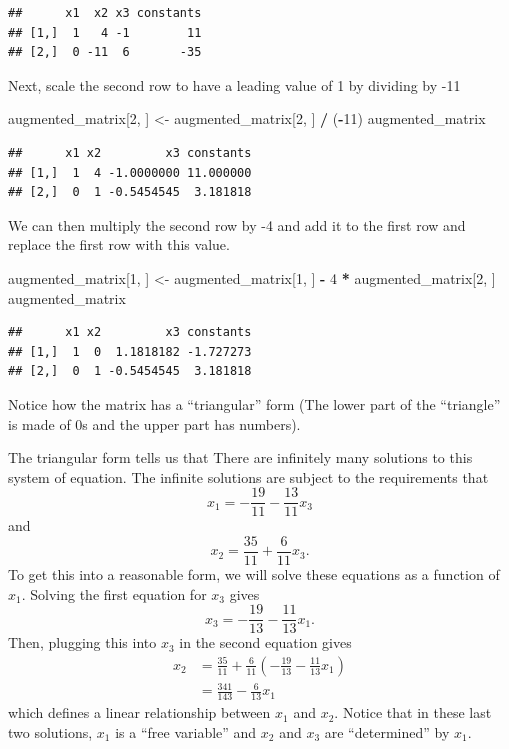 \documentclass[
]{book}
\newenvironment{Shaded}{\begin{snugshade}}{\end{snugshade}}
\newcommand{\DecValTok}[1]{\textcolor[rgb]{0.00,0.00,0.81}{#1}}
\newcommand{\NormalTok}[1]{#1}
\newcommand{\OperatorTok}[1]{\textcolor[rgb]{0.81,0.36,0.00}{\textbf{#1}}}
\newcommand{\StringTok}[1]{\textcolor[rgb]{0.31,0.60,0.02}{#1}}
\theoremstyle{definition}
\theoremstyle{definition}
\theoremstyle{definition}
\theoremstyle{definition}
\theoremstyle{remark}
\begin{document}
\begin{verbatim}
##      x1  x2 x3 constants
## [1,]  1   4 -1        11
## [2,]  0 -11  6       -35
\end{verbatim}

Next, scale the second row to have a leading value of 1 by dividing by -11

\begin{Shaded}
\begin{Highlighting}[]
\NormalTok{augmented_matrix[}\DecValTok{2}\NormalTok{, ] <-}\StringTok{ }\NormalTok{augmented_matrix[}\DecValTok{2}\NormalTok{, ] }\OperatorTok{/}\StringTok{ }\NormalTok{(}\OperatorTok{-}\DecValTok{11}\NormalTok{)}
\NormalTok{augmented_matrix}
\end{Highlighting}
\end{Shaded}

\begin{verbatim}
##      x1 x2         x3 constants
## [1,]  1  4 -1.0000000 11.000000
## [2,]  0  1 -0.5454545  3.181818
\end{verbatim}

We can then multiply the second row by -4 and add it to the first row and replace the first row with this value.

\begin{Shaded}
\begin{Highlighting}[]
\NormalTok{augmented_matrix[}\DecValTok{1}\NormalTok{, ] <-}\StringTok{ }\NormalTok{augmented_matrix[}\DecValTok{1}\NormalTok{, ] }\OperatorTok{-}\StringTok{ }\DecValTok{4} \OperatorTok{*}\StringTok{ }\NormalTok{augmented_matrix[}\DecValTok{2}\NormalTok{, ]}
\NormalTok{augmented_matrix}
\end{Highlighting}
\end{Shaded}

\begin{verbatim}
##      x1 x2         x3 constants
## [1,]  1  0  1.1818182 -1.727273
## [2,]  0  1 -0.5454545  3.181818
\end{verbatim}

Notice how the matrix has a ``triangular'' form (The lower part of the ``triangle'' is made of 0s and the upper part has numbers).

The triangular form tells us that There are infinitely many solutions to this system of equation. The infinite solutions are subject to the requirements that
\[x_1 = - \frac{19}{11} - \frac{13}{11} x_3\]
and
\[x_2 = \frac{35}{11} + \frac{6}{11} x_3.\]
To get this into a reasonable form, we will solve these equations as a function of \(x_1\). Solving the first equation for \(x_3\) gives
\[x_3 = - \frac{19}{13} -\frac{11}{13} x_1.\]
Then, plugging this into \(x_3\) in the second equation gives
\[
\begin{aligned}
x_2 & = \frac{35}{11} + \frac{6}{11} \left( - \frac{19}{13} -\frac{11}{13} x_1 \right) \\
& = \frac{341}{143} - \frac{6}{13} x_1
\end{aligned}
\]
which defines a linear relationship between \(x_1\) and \(x_2\). Notice that in these last two solutions, \(x_1\) is a ``free variable'' and \(x_2\) and \(x_3\) are ``determined'' by \(x_1\).
\end{document}
